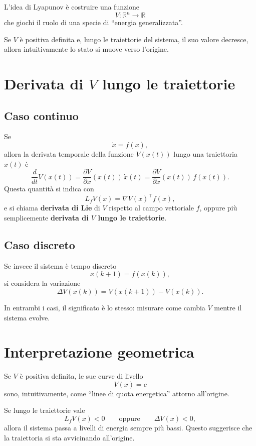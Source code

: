 L'idea di Lyapunov è costruire una funzione
\[
V:\mathbb{R}^n\to\mathbb{R}
\]
che giochi il ruolo di una specie di ``energia generalizzata''.

Se \(V\) è positiva definita e, lungo le traiettorie del sistema, il suo valore decresce, allora intuitivamente lo stato si muove verso l'origine.

\section{Derivata di \(V\) lungo le traiettorie}

\subsection{Caso continuo}
Se
\[
\dot x = f(x),
\]
allora la derivata temporale della funzione \(V(x(t))\) lungo una traiettoria \(x(t)\) è
\[
\frac{d}{dt}V(x(t))
=
\frac{\partial V}{\partial x}(x(t))\,\dot x(t)
=
\frac{\partial V}{\partial x}(x(t))\,f(x(t)).
\]
Questa quantità si indica con
\[
L_fV(x)=\nabla V(x)^\top f(x),
\]
e si chiama \textbf{derivata di Lie} di \(V\) rispetto al campo vettoriale \(f\), oppure più semplicemente \textbf{derivata di \(V\) lungo le traiettorie}.

\subsection{Caso discreto}
Se invece il sistema è tempo discreto
\[
x(k+1)=f(x(k)),
\]
si considera la variazione
\[
\Delta V(x(k)) = V(x(k+1))-V(x(k)).
\]

In entrambi i casi, il significato è lo stesso: misurare come cambia \(V\) mentre il sistema evolve.

\section{Interpretazione geometrica}

Se \(V\) è positiva definita, le sue curve di livello
\[
V(x)=c
\]
sono, intuitivamente, come ``linee di quota energetica'' attorno all'origine.

Se lungo le traiettorie vale
\[
L_fV(x)<0
\qquad\text{oppure}\qquad
\Delta V(x)<0,
\]
allora il sistema passa a livelli di energia sempre più bassi. Questo suggerisce che la traiettoria si sta avvicinando all'origine.

